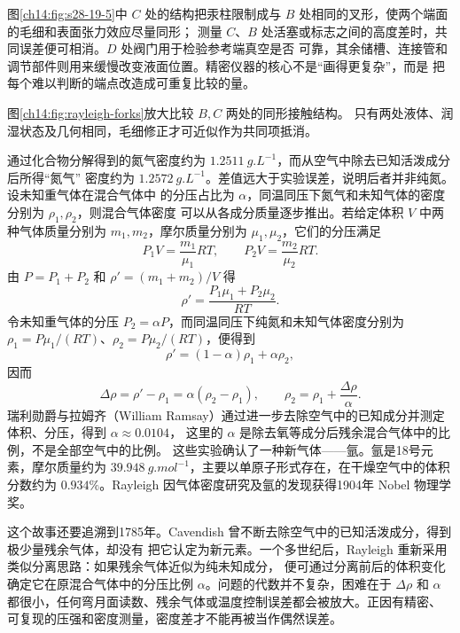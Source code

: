图\ref{ch14:fig:s28-19-5}中 $C$ 处的结构把汞柱限制成与 $B$ 处相同的叉形，使两个端面的毛细和表面张力效应尽量同形；
测量 $C$、$B$ 处活塞或标志之间的高度差时，共同误差便可相消。$D$ 处阀门用于检验参考端真空是否
可靠，其余储槽、连接管和调节部件则用来缓慢改变液面位置。精密仪器的核心不是“画得更复杂”，而是
把每个难以判断的端点改造成可重复比较的量。

\figureNineteenFiveFaithful

图\ref{ch14:fig:rayleigh-forks}放大比较 $B,C$ 两处的同形接触结构。
只有两处液体、润湿状态及几何相同，毛细修正才可近似作为共同项抵消。
\rayleighApparatusDiagram

通过化合物分解得到的氮气密度约为 $\SI{1.2511}{g.L^{-1}}$，而从空气中除去已知活泼成分后所得“氮气”
密度约为 $\SI{1.2572}{g.L^{-1}}$。差值远大于实验误差，说明后者并非纯氮。设未知重气体在混合气体中
的分压占比为 $\alpha$，同温同压下氮气和未知气体的密度分别为 $\rho_1,\rho_2$，则混合气体密度
可以从各成分质量逐步推出。若给定体积 $V$ 中两种气体质量分别为 $m_1,m_2$，摩尔质量分别为
$\mu_1,\mu_2$，它们的分压满足
\begin{equation}
  P_1V=\frac{m_1}{\mu_1}RT,
  \qquad
  P_2V=\frac{m_2}{\mu_2}RT.
\end{equation}
由 $P=P_1+P_2$ 和 $\rho'=(m_1+m_2)/V$ 得
\begin{equation}
  \rho'=\frac{P_1\mu_1+P_2\mu_2}{RT}.
\end{equation}
令未知重气体的分压 $P_2=\alpha P$，而同温同压下纯氮和未知气体密度分别为
$\rho_1=P\mu_1/(RT)$、$\rho_2=P\mu_2/(RT)$，便得到
\begin{equation}
  \rho'=(1-\alpha)\rho_1+\alpha\rho_2,
\end{equation}
因而
\begin{equation}
  \Delta\rho=\rho'-\rho_1=\alpha(\rho_2-\rho_1),
  \qquad
  \rho_2=\rho_1+\frac{\Delta\rho}{\alpha}.
\end{equation}
瑞利勋爵与拉姆齐（William Ramsay）通过进一步去除空气中的已知成分并测定体积、分压，得到 $\alpha\approx0.0104$，
这里的 $\alpha$ 是除去氧等成分后残余混合气体中的比例，不是全部空气中的比例。
这些实验确认了一种新气体——氩。氩是18号元素，摩尔质量约为
$\SI{39.948}{g.mol^{-1}}$，主要以单原子形式存在，在干燥空气中的体积分数约为 $0.934\%$。Rayleigh
因气体密度研究及氩的发现获得1904年 Nobel 物理学奖。

这个故事还要追溯到1785年。Cavendish 曾不断去除空气中的已知活泼成分，得到极少量残余气体，却没有
把它认定为新元素。一个多世纪后，Rayleigh 重新采用类似分离思路：如果残余气体近似为纯未知成分，
便可通过分离前后的体积变化确定它在原混合气体中的分压比例 $\alpha$。问题的代数并不复杂，困难在于
$\Delta\rho$ 和 $\alpha$ 都很小，任何弯月面读数、残余气体或温度控制误差都会被放大。正因有精密、
可复现的压强和密度测量，密度差才不能再被当作偶然误差。

